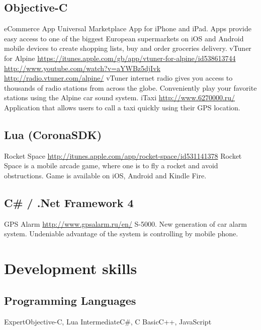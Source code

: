 \documentclass[11pt,a4paper]{moderncv}
\begin{document}
  \subsection{Objective-C}
  \cvline
    {eCommerce App}
    {Universal Marketplace App for iPhone and iPad. Apps provide easy access to one of the biggest European supermarkets on iOS and Android mobile devices to create shopping lists, buy and order groceries delivery.}
  \cvline
    {vTuner for Alpine}
    {\url{https://itunes.apple.com/gb/app/vtuner-for-alpine/id538613744}\newline{}
    \url{http://www.youtube.com/watch?v=aYWBz5djIvk}\newline
    \url{http://radio.vtuner.com/alpine/}\newline
    vTuner internet radio gives you access to thousands of radio stations from across the globe.
    \newline Conveniently play your favorite stations using the Alpine car sound system. }
  \cvline
    {iTaxi}
    {\url{http://www.6270000.ru/}\newline{}
    Application that allows users to call a taxi quickly using their GPS location.}
    
  \subsection{Lua (CoronaSDK)}
  \cvline
    {Rocket Space}
    {\url{http://itunes.apple.com/app/rocket-space/id531141378}\newline{}
    Rocket Space is a mobile arcade game, where one is to fly a rocket and avoid obstructions.\newline
    Game is available on iOS, Android and Kindle Fire.}
    
  \subsection{C\# / .Net Framework 4}
  \cvline
    {GPS Alarm}
    {\url{http://www.gpsalarm.ru/en/}\newline{}
    S-5000. New generation of car alarm system.\newline
    Undeniable advantage of the system is controlling by mobile phone.}

\section{Development skills}
\subsection{Programming Languages}
\cvline
  {Expert}{Objective-C, Lua}
\cvline
  {Intermediate}{C\#, C}
\cvline
  {Basic}{C++, JavaScript}
\end{document}
